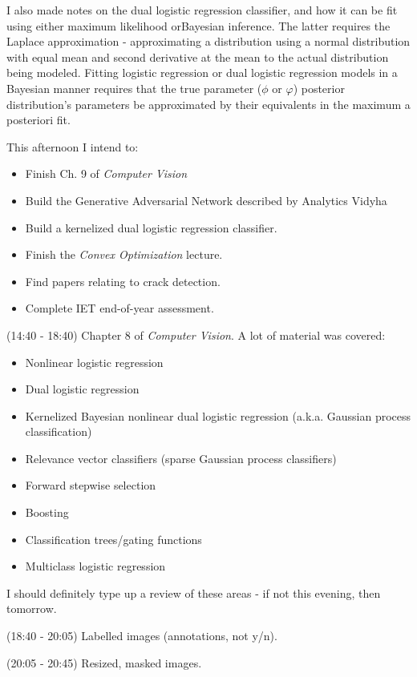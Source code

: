 \documentclass[idxtotoc,hyperref,openany]{labbook} %
\begin{document}
 I also made notes on the dual logistic regression classifier, and how it can be fit using either maximum likelihood orBayesian inference. The latter requires the Laplace approximation - approximating a distribution using a normal distribution with equal mean and second derivative at the mean to the actual distribution being modeled. Fitting logistic regression or dual logistic regression models in a Bayesian manner requires that the true parameter ($\phi$ or $\varphi$) posterior distribution's parameters be approximated by their equivalents in the maximum a posteriori fit.

 This afternoon I intend to:
 \begin{itemize}
 	\item Finish Ch. 9 of \emph{Computer Vision}
 	\item Build the Generative Adversarial Network described by Analytics Vidyha
 	\item Build a kernelized dual logistic regression classifier.
 	\item Finish the \emph{Convex Optimization} lecture.
 	\item Find papers relating to crack detection.
 	\item Complete IET end-of-year assessment.
\end{itemize}

 
 (14:40 - 18:40) Chapter 8 of \emph{Computer Vision}. A lot of material was covered:
 \begin{itemize}
 	\item Nonlinear logistic regression
	\item Dual logistic regression
	\item Kernelized Bayesian nonlinear dual logistic regression (a.k.a. Gaussian process classification)
	\item Relevance vector classifiers (sparse Gaussian process classifiers)
	\item Forward stepwise selection
	\item Boosting
	\item Classification trees/gating functions
	\item Multiclass logistic regression
\end{itemize}
I should definitely type up a review of these areas - if not this evening, then tomorrow.

(18:40 - 20:05) Labelled images (annotations, not y/n).

(20:05 - 20:45) Resized, masked images.
\end{document}
